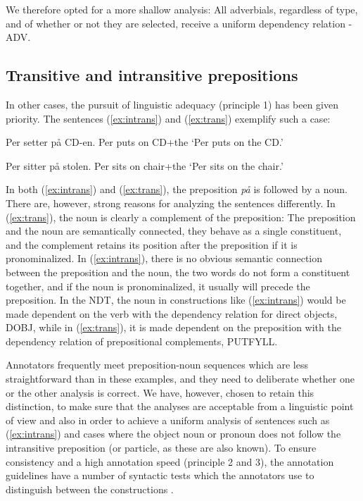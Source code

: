\documentclass[10pt,a4paper]{article}
\begin{document}
We therefore opted for a more shallow analysis:
All adverbials, regardless of type,
and of whether or not they are selected,
receive a uniform dependency relation - ADV. 

\subsection{Transitive and intransitive prepositions}\label{prep}
In other cases, the pursuit of linguistic adequacy (principle 1) has been given priority. The sentences (\ref{ex:intrans}) and (\ref{ex:trans}) exemplify such a case:

\begin{examples}
\item\label{ex:intrans}
\gll Per setter på CD-en.
Per puts on CD+the
\glt `Per puts on the CD.'
\glend

\item\label{ex:trans}
\gll Per sitter på stolen.
Per sits on chair+the
\glt `Per sits on the chair.'
\glend
\end{examples}

In both (\ref{ex:intrans}) and (\ref{ex:trans}), the preposition \emph{på} is followed by a noun. There are, however, strong reasons for analyzing the sentences differently. In (\ref{ex:trans}), the noun is clearly a complement of the preposition: The preposition and the noun are semantically connected, they behave as a single constituent, and the complement retains its position after the preposition if it is pronominalized. In (\ref{ex:intrans}), there is no obvious semantic connection between the preposition and the noun, the two words do not form a constituent together, and if the noun is pronominalized, it usually will precede the preposition. In the NDT, the noun in constructions like (\ref{ex:intrans}) would be made dependent on the verb with the dependency relation for direct objects, DOBJ, while in (\ref{ex:trans}), it is made dependent on the preposition with the dependency relation of prepositional complements, PUTFYLL.

Annotators frequently meet preposition-noun sequences which are less straightforward than in these examples, and they need to deliberate whether one or the other analysis is correct. We have, however, chosen to retain this distinction, to make sure that the analyses are acceptable from a linguistic point of view and also in order to achieve a uniform analysis of sentences such as (\ref{ex:intrans}) and cases where the object noun or pronoun does not follow the intransitive preposition (or particle, as these are also known). To ensure consistency and a high annotation speed (principle 2 and 3), the annotation guidelines have a number of syntactic tests which the annotators use to distinguish between the constructions \cite[54-56]{Kin:Sol:Eri:2013}.
\end{document}
